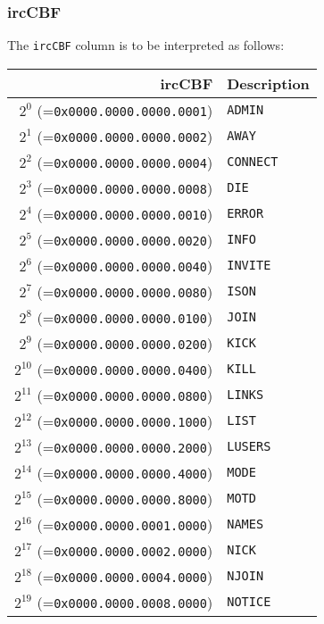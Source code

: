 \documentclass[documentation]{subfiles}
\begin{document}
\subsubsection{ircCBF}\label{ircCBF}
The {\tt ircCBF} column is to be interpreted as follows:\\
\begin{minipage}{0.49\textwidth}
    \begin{longtable}{rl}
        \toprule
        {\bf ircCBF} & {\bf Description} \\
        \midrule\endhead%
        $2^{0}$  (={\tt 0x0000.0000.0000.0001}) & {\tt ADMIN  }\\
        $2^{1}$  (={\tt 0x0000.0000.0000.0002}) & {\tt AWAY   }\\
        $2^{2}$  (={\tt 0x0000.0000.0000.0004}) & {\tt CONNECT}\\
        $2^{3}$  (={\tt 0x0000.0000.0000.0008}) & {\tt DIE    }\\
        $2^{4}$  (={\tt 0x0000.0000.0000.0010}) & {\tt ERROR  }\\
        $2^{5}$  (={\tt 0x0000.0000.0000.0020}) & {\tt INFO   }\\
        $2^{6}$  (={\tt 0x0000.0000.0000.0040}) & {\tt INVITE }\\
        $2^{7}$  (={\tt 0x0000.0000.0000.0080}) & {\tt ISON   }\\
        $2^{8}$  (={\tt 0x0000.0000.0000.0100}) & {\tt JOIN   }\\
        $2^{9}$  (={\tt 0x0000.0000.0000.0200}) & {\tt KICK   }\\
        $2^{10}$ (={\tt 0x0000.0000.0000.0400}) & {\tt KILL   }\\
        $2^{11}$ (={\tt 0x0000.0000.0000.0800}) & {\tt LINKS  }\\
        $2^{12}$ (={\tt 0x0000.0000.0000.1000}) & {\tt LIST   }\\
        $2^{13}$ (={\tt 0x0000.0000.0000.2000}) & {\tt LUSERS }\\
        $2^{14}$ (={\tt 0x0000.0000.0000.4000}) & {\tt MODE   }\\
        $2^{15}$ (={\tt 0x0000.0000.0000.8000}) & {\tt MOTD   }\\
        $2^{16}$ (={\tt 0x0000.0000.0001.0000}) & {\tt NAMES  }\\
        $2^{17}$ (={\tt 0x0000.0000.0002.0000}) & {\tt NICK   }\\
        $2^{18}$ (={\tt 0x0000.0000.0004.0000}) & {\tt NJOIN  }\\
        $2^{19}$ (={\tt 0x0000.0000.0008.0000}) & {\tt NOTICE }\\

\end{longtable}
\end{minipage}
\end{document}
